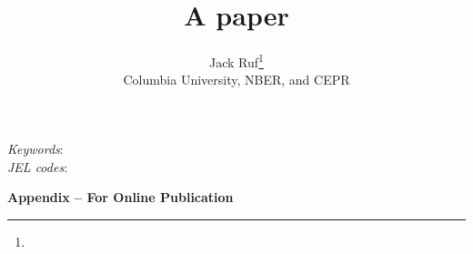 \documentclass[11pt]{article}
\title{A paper}
\author{Jack Ruf\thanks{\rufemail} \\ Columbia University, NBER, and CEPR}
\date{\monthname[\the\month] \the\year}
\begin{document}



\begin{abstract}
\end{abstract}
\vspace{1cm}
{\small
\noindent \textit{Keywords}:  \\
\textit{JEL codes}: 
}
\thispagestyle{empty}
\newpage
\setcounter{page}{1}


%
%
%
%


{}

\newpage
\clearpage

\begin{center} \Large \textbf{Appendix -- For Online Publication} \end{center}
\appendix
{}

%
%
%
\end{document}
